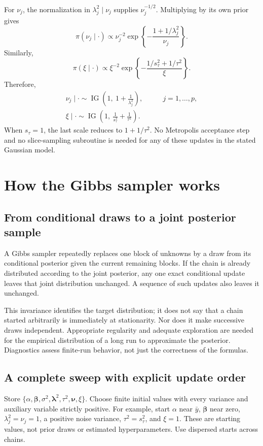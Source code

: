 \documentclass[11pt,letterpaper]{article}
\numberwithin{equation}{section}
\newcommand{\IG}{\operatorname{IG}}
\newcommand{\given}{\mid}
\newcommand{\bbeta}{\bm{\beta}}
\newcommand{\blambda}{\bm{\lambda}}
\newcommand{\bnu}{\bm{\nu}}
\begin{document}
For \(\nu_j\), the normalization in
\(\lambda_j^2\given\nu_j\) supplies \(\nu_j^{-1/2}\). Multiplying by
its own prior gives
\[
 \pi(\nu_j\given\cdot)\propto
 \nu_j^{-2}\exp\left\{-\frac{1+1/\lambda_j^2}{\nu_j}\right\}.
\]
Similarly,
\[
 \pi(\xi\given\cdot)\propto
 \xi^{-2}\exp\left\{-\frac{1/s_\tau^2+1/\tau^2}{\xi}\right\}.
\]
Therefore,
\begin{align}
 \boxed{\nu_j\given\cdot\sim\IG\left(1,\ 1+\frac1{\lambda_j^2}\right),}
 &\qquad j=1,\ldots,p,\label{eq:nu}\\
 \boxed{\xi\given\cdot\sim\IG\left(1,\ \frac1{s_\tau^2}+\frac1{\tau^2}\right).}
 &\label{eq:xi}
\end{align}
When \(s_\tau=1\), the last scale reduces to \(1+1/\tau^2\).
No Metropolis acceptance step and no slice-sampling subroutine is needed for
any of these updates in the stated Gaussian model.

\section{How the Gibbs sampler works}\label{sec:sweep}

\subsection{From conditional draws to a joint posterior sample}

A Gibbs sampler repeatedly replaces one block of unknowns by a draw from its
conditional posterior given the current remaining blocks. If the chain is
already distributed according to the joint posterior, any one exact
conditional update leaves that joint distribution unchanged. A sequence of
such updates also leaves it unchanged.

This invariance identifies the target distribution; it does not say that a
chain started arbitrarily is immediately at stationarity. Nor does it make
successive draws independent. Appropriate regularity and adequate exploration
are needed for the empirical distribution of a long run to approximate the
posterior. Diagnostics assess finite-run behavior, not just the correctness
of the formulas.

\subsection{A complete sweep with explicit update order}

Store
\(\{\alpha,\bbeta,\sigma^2,\blambda^2,\tau^2,\bnu,\xi\}\).
Choose finite initial values with every variance and auxiliary variable
strictly positive. For example, start \(\alpha\) near \(\bar y\),
\(\bbeta\) near zero, \(\lambda_j^2=\nu_j=1\), a positive noise variance,
\(\tau^2=s_\tau^2\), and \(\xi=1\). These are starting values, not prior
draws or estimated hyperparameters. Use dispersed starts across chains.
\end{document}
